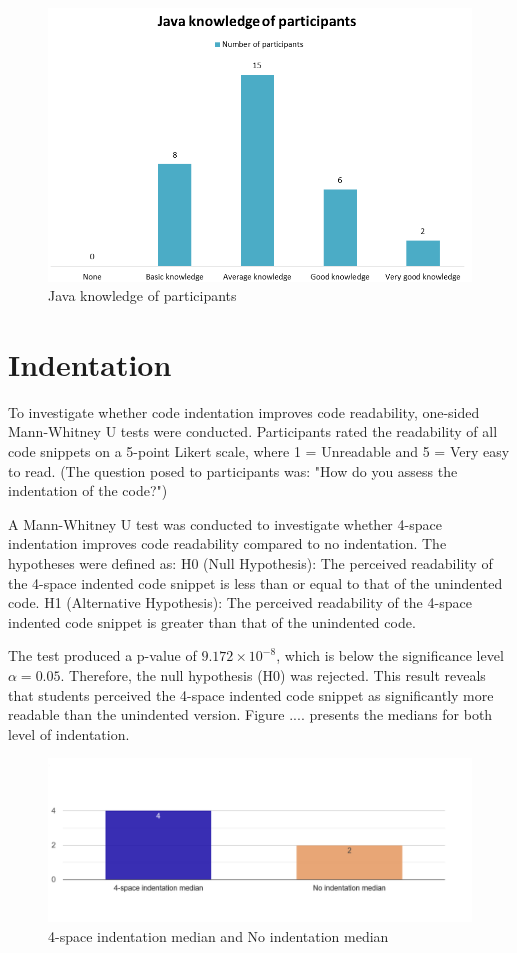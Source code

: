 \begin{figure} [H]
  \centering
  \includegraphics[scale=0.8]{figures/java_kn.png}
  \caption{Java knowledge of participants}
  \label{fig:AnhangsChor}
\end{figure}


\section{Indentation}
To investigate whether code indentation improves code readability, one-sided Mann-Whitney U tests were conducted. Participants rated the readability of all code snippets on a 5-point Likert scale, where 1 = Unreadable and 5 = Very easy to read. (The question posed to participants was: "How do you assess the indentation of the code?")

A Mann-Whitney U test was conducted to investigate whether 4-space indentation improves code readability compared to no indentation. The hypotheses were defined as: H0 (Null Hypothesis): The perceived readability of the 4-space indented code snippet is less than or equal to that of the unindented code. H1 (Alternative Hypothesis): The perceived readability of the 4-space indented code snippet is greater than that of the unindented code.


The test produced a p-value of \(9.172 \times 10^{-8}\), which is below the significance level \(\alpha = 0.05\). Therefore, the null hypothesis (H0) was rejected. This result reveals that students perceived the 4-space indented code snippet as significantly more readable than the unindented version. Figure .... presents the medians for both level of indentation.

\begin{figure} [H]
  \centering
  \includegraphics[scale=0.4]{figures/4-0-q5png.png}
  \caption{4-space indentation median and No indentation median}
  \label{fig:AnhangsChor}
\end{figure}


